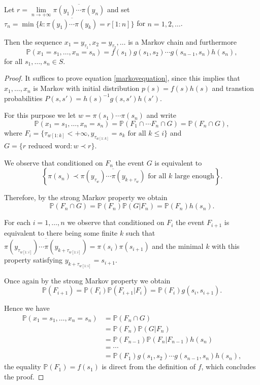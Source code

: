 \documentclass[10pt,a4paper]{amsart}
\newcommand{\Pof}[1]{\mathbb{P}\left(#1\right)}
\begin{document}
\begin{lemma}\label{markovlemma}
 Let \(r = \lim\limits_{n \to +\infty}\overline{\pi(y_1)\cdots \pi(y_n)}\) and set \(\tau_n = \min\lbrace k: \overline{\pi(y_1)\cdots \pi(y_k)} = r[1:n]\rbrace\) for \(n = 1,2,\ldots\).
 
 Then the sequence \(x_1 = y_{\tau_1},x_2 = y_{\tau_2},\ldots\) is a Markov chain and furthermore
 \begin{equation}\label{markovequation}
 \Pof{x_1 = s_1,\ldots, x_n = s_n} = f(s_1)g(s_1,s_2)\cdots g(s_{n-1},s_n)h(s_n),
 \end{equation}
 for all \(s_1,\ldots, s_n \in S\).
\end{lemma}

\begin{proof}
It suffices to prove equation \ref{markovequation}, since this implies that \(x_1,\ldots, x_n\) is Markov with initial distribution \(p(s) = f(s)h(s)\) and transtion probabilities \(P(s,s') = h(s)^{-1}g(s,s')h(s')\).

For this purpose we let \(w = \pi(s_1)\cdots \pi(s_n)\) and write
\begin{equation} 
\Pof{x_1 = s_1,\ldots, x_n = s_n} = \Pof{F_1 \cap \cdots F_n \cap G} = \Pof{F_n \cap G},
\end{equation}
where \(F_i = \lbrace \tau_{w[1:k]} < +\infty, y_{\tau_{w[1:k]}} = s_k\text{ for all }k \le i\rbrace\) and \(G = \lbrace r\text{ reduced word}: w \prec r\rbrace\).

We observe that conditioned on \(F_n\) the event \(G\) is equivalent to
\[\left\lbrace\pi(s_n) \prec \overline{\pi(y_{\tau_w})\cdots \pi(y_{k + \tau_w})}\text{ for all }k\text{ large enough}\right\rbrace.\]

Therefore, by the strong Markov property we obtain 
\begin{equation}\Pof{F_n \cap G} = \Pof{F_n}\Pof{G | F_n} = \Pof{F_n}h(s_n).
\end{equation}


For each \(i = 1,\ldots,n\) we observe that conditioned on \(F_i\) the event \(F_{i+1}\) is equivalent to there being some finite \(k\) such that \(\overline{\pi(y_{\tau_{w[1:i]}})\cdots \pi(y_{k + \tau_{w[1:i]}})} = \pi(s_i)\pi(s_{i+1})\) and the minimal \(k\) with this property satisfying \(y_{k + \tau_{w[1:i]}} = s_{i+1}\).

Once again by the strong Markov property we obtain 
\begin{equation}
\Pof{F_{i+1}} = \Pof{F_i}\Pof{F_{i+1}|F_i} = \Pof{F_i}g(s_i,s_{i+1}).
\end{equation}


Hence we have 
\begin{align*}
 \Pof{x_1 = s_1,\ldots, x_n = s_n} &= \Pof{F_n \cap G}
 \\ &= \Pof{F_n}\Pof{G|F_n}
 \\ &= \Pof{F_{n-1}}\Pof{F_n|F_{n-1}}h(s_n)
 \\ &= \cdots 
 \\ &= \Pof{F_1}g(s_1,s_2)\cdots g(s_{n-1},s_n)h(s_n),
\end{align*}
the equality \(\Pof{F_1} = f(s_1)\) is direct from the definition of \(f\), which concludes the proof.
\end{proof}
\end{document}
